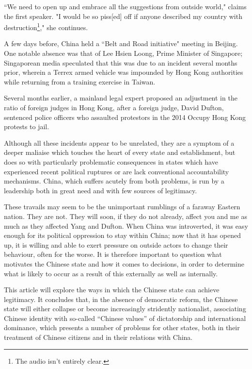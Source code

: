 \documentclass[10pt,a4paper,twocolumn]{article}
\newcounter{count}
\begin{document}
``We need to open up and embrace all the suggestions from outside world," claims the first speaker. "I would be so piss[ed] off if anyone described my country with destruction\footnote{The audio isn't entirely clear.}," she continues.

A few days before, China held a ``Belt and Road initiative" meeting in Beijing. One notable absence was that of Lee Hsien Loong, Prime Minister of Singapore; Singaporean media speculated that this was due to an incident several months prior, wherein a Terrex armed vehicle was impounded by Hong Kong authorities while returning from a training exercise in Taiwan\cite{beltroad}.

Several months earlier, a mainland legal expert proposed an adjustment in the ratio of foreign judges in Hong Kong, after a foreign judge, David Dufton, sentenced police officers who assaulted protestors in the 2014 Occupy Hong Kong protests to jail\cite{foreignjudge}.

Although all these incidents appear to be unrelated, they are a symptom of a deeper maliaise which touches the heart of every state and establishment, but does so with particularly problematic consequences in states which have experienced recent political ruptures or are lack conventional accountability mechanisms. China, which suffers acutely from both problems, is run by a leadership both in great need and with few sources of legitimacy.

These travails may seem to be the unimportant rumblings of a faraway Eastern nation. They are not. They will soon, if they do not already, affect you and me as much as they affected Yang and Dufton. When China was introverted, it was easy enough for its political oppression to stay within China; now that it has opened up, it is willing and able to exert pressure on outside actors to change their behaviour, often for the worse. It is therefore important to question what motivates the Chinese state and how it comes to decisions, in order to determine what is likely to occur as a result of this externally as well as internally.

This article will explore the ways in which the Chinese state can achieve legitimacy. It concludes that, in the absence of democratic reform, the Chinese state will either collapse or become increasingly stridently nationalist, associating Chinese identity with so-called ``Chinese values'' of dictatorship and international dominance, which presents a number of problems for other states, both in their treatment of Chinese citizens and in their relations with China.
\end{document}
